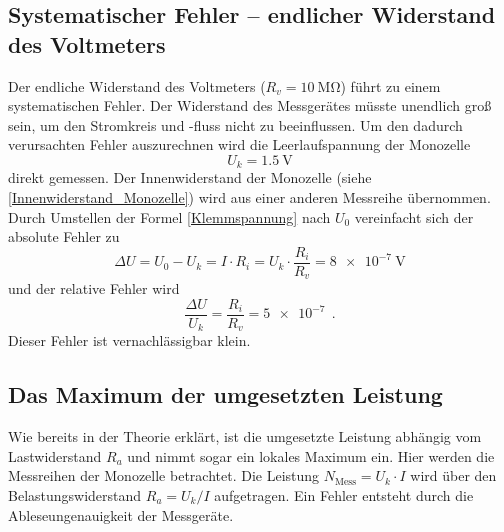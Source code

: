 \subsection{Systematischer Fehler -- endlicher Widerstand des Voltmeters}
\label{systhematischer_fehler}
Der endliche Widerstand des Voltmeters ($R_v = \SI{10}{\mega\ohm}$) führt zu einem systematischen Fehler. Der Widerstand des Messgerätes müsste unendlich groß sein, um den Stromkreis und -fluss nicht zu beeinflussen. Um den dadurch verursachten Fehler auszurechnen wird die Leerlaufspannung der Monozelle
\begin{equation}
U_k = \SI{1.5}{\volt}
\end{equation}
direkt gemessen.
Der Innenwiderstand der Monozelle (siehe \eqref{Innenwiderstand_Monozelle}) wird aus einer anderen Messreihe übernommen. Durch Umstellen der Formel \eqref{Klemmspannung} nach $U_0$ vereinfacht sich der absolute Fehler zu 
\begin{equation}
\Delta U = U_0 - U_k = I\cdot R_i = U_k \cdot \frac{R_i}{R_v} = \SI{8e-7}{\volt}
\end{equation}
und der relative Fehler wird 
\begin{equation}
\frac{\Delta U}{U_k} = \frac{R_i}{R_v} = \SI{5e-7}{} \ .
\end{equation}
Dieser Fehler ist vernachlässigbar klein.

\clearpage 
 
\subsection{Das Maximum der umgesetzten Leistung}
Wie bereits in der Theorie erklärt, ist die umgesetzte Leistung abhängig vom Lastwiderstand $R_a$ und nimmt sogar ein lokales Maximum ein. Hier werden die Messreihen der Monozelle betrachtet. Die Leistung $N_\text{Mess} = U_k \cdot I $ wird über den Belastungswiderstand $R_a = U_k / I$ aufgetragen. Ein Fehler entsteht durch die Ableseungenauigkeit der Messgeräte.


